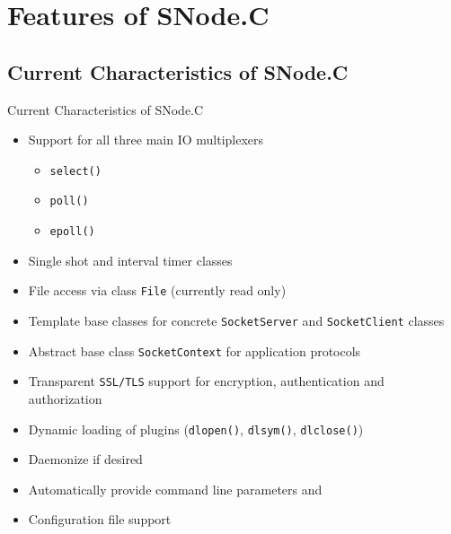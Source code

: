 ﻿\withsectionpage
\section{Features of SNode.C}
\nosectionpage

\subsection{Current Characteristics of SNode.C}
\begin{frame}{Current Characteristics of SNode.C}
   \begin{itemize}
     \item Support for all \alert{three} main \alert{IO multiplexers}
     \begin{itemize}
       \item \texttt{select()}
       \item \texttt{poll()}
       \item \texttt{epoll()}
     \end{itemize}
     \item \alert{Single shot} and \alert{interval timer} classes
     \item \alert{File access} via class \texttt{File} (currently read only)
     \item \alert{Template} base classes for concrete \texttt{SocketServer} and \texttt{SocketClient} classes
     \item \alert{Abstract} base class \texttt{SocketContext} for application protocols
     \item \alert{Transparent \texttt{SSL/TLS}} support for \alert{encryption}, \alert{authentication} and \alert{authorization}
     \item Dynamic loading of \alert{plugins} (\texttt{dlopen()}, \texttt{dlsym()}, \texttt{dlclose()})
     \item \alert{Daemonize} if desired
     \item Automatically provide \alert{command line parameters} and
     \item \alert{Configuration file} support
   \end{itemize}
\end{frame}
